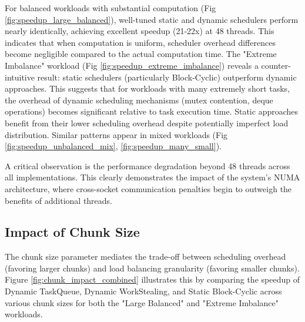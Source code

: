 \documentclass[10pt]{article}
\begin{document}
For balanced workloads with substantial computation (Fig \ref{fig:speedup_large_balanced}), well-tuned static and dynamic schedulers perform nearly identically, achieving excellent speedup (21-22x) at 48 threads. This indicates that when computation is uniform, scheduler overhead differences become negligible compared to the actual computation time. The "Extreme Imbalance" workload (Fig \ref{fig:speedup_extreme_imbalance}) reveals a counter-intuitive result: static schedulers (particularly Block-Cyclic) outperform dynamic approaches. This suggests that for workloads with many extremely short tasks, the overhead of dynamic scheduling mechanisms (mutex contention, deque operations) becomes significant relative to task execution time. Static approaches benefit from their lower scheduling overhead despite potentially imperfect load distribution. Similar patterns appear in mixed workloads (Fig \ref{fig:speedup_unbalanced_mix}, \ref{fig:speedup_many_small}).

A critical observation is the performance degradation beyond 48 threads across all implementations. This clearly demonstrates the impact of the system's NUMA architecture, where cross-socket communication penalties begin to outweigh the benefits of additional threads.

\subsection{Impact of Chunk Size}
The chunk size parameter mediates the trade-off between scheduling overhead (favoring larger chunks) and load balancing granularity (favoring smaller chunks). Figure \ref{fig:chunk_impact_combined} illustrates this by comparing the speedup of Dynamic TaskQueue, Dynamic WorkStealing, and Static Block-Cyclic across various chunk sizes for both the "Large Balanced" and "Extreme Imbalance" workloads.
\end{document}
